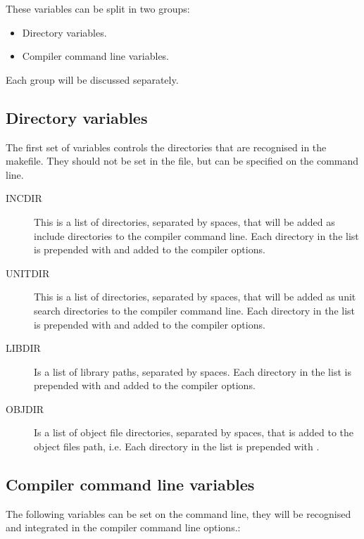 These variables can be split in two groups:
\begin{itemize}
\item Directory variables.
\item Compiler command line variables.
\end{itemize}
Each group will be discussed separately.

\subsection{Directory variables}

The first set of variables controls the directories that are
recognised in the makefile. They should not be set in the
 file, but can be specified on the command line.
\begin{description}
\item[INCDIR] This is a list of directories, separated by spaces, that will
be added as include directories to the compiler command line.  Each
directory in the list is prepended with  and added to the
compiler options.
\item[UNITDIR] This is a list of directories, separated by spaces, that will
be added as unit search directories to the compiler command line.  Each
directory in the list is prepended with  and added to the
compiler options.
\item[LIBDIR] Is a list of library paths, separated by spaces. Each
directory in the list is prepended with  and added to the
compiler options.
\item[OBJDIR] Is a list of object file directories, separated by spaces, that is
added to the object files path, i.e. Each directory in the list is prepended with
.
\end{description}

\subsection{Compiler command line variables }
The following variables can be set on the  command line,
they will be recognised and integrated in the compiler command line options.:

